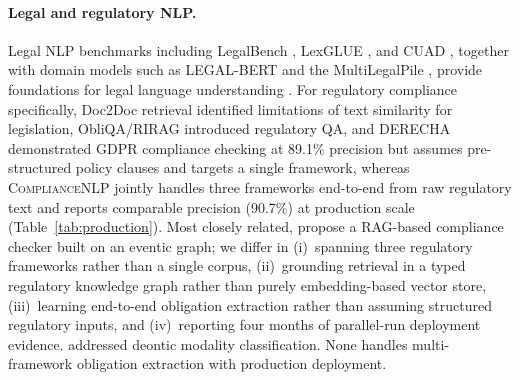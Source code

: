 \documentclass[11pt]{article}
\begin{document}
\paragraph{Legal and regulatory NLP.}
Legal NLP benchmarks including LegalBench \citep{guha2023legalbench}, LexGLUE \citep{chalkidis2022lexglue}, and CUAD \citep{hendrycks2021cuad}, together with domain models such as LEGAL-BERT \citep{chalkidis2020legalbert} and the MultiLegalPile \citep{niklaus2024multilegalpile}, provide foundations for legal language understanding \citep{rosa2025legalnlpsurvey,leitner2020germanner}. For regulatory compliance specifically, Doc2Doc retrieval \citep{chalkidis2021doc2doc} identified limitations of text similarity for legislation, ObliQA/RIRAG \citep{gokhan2025regnlp} introduced regulatory QA, and DERECHA \citep{amaral2023derecha} demonstrated GDPR compliance checking at 89.1\% precision but assumes pre-structured policy clauses and targets a single framework, whereas \textsc{ComplianceNLP} jointly handles three frameworks end-to-end from raw regulatory text and reports comparable precision (90.7\%) at production scale (Table~\ref{tab:production}). Most closely related, \citet{sun2025compliance} propose a RAG-based compliance checker built on an eventic graph; we differ in (i)~spanning three regulatory frameworks rather than a single corpus, (ii)~grounding retrieval in a typed regulatory knowledge graph rather than purely embedding-based vector store, (iii)~learning end-to-end obligation extraction rather than assuming structured regulatory inputs, and (iv)~reporting four months of parallel-run deployment evidence. \citet{minkova2023deontic} addressed deontic modality classification. None handles multi-framework obligation extraction with production deployment.
\end{document}
